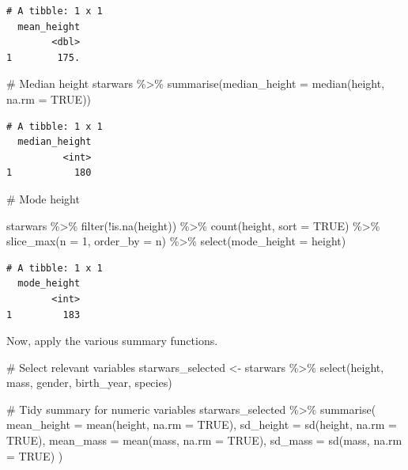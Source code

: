 \documentclass[
  man,
  floatsintext,
  longtable,
  nolmodern,
  notxfonts,
  notimes,
  colorlinks=true,linkcolor=blue,citecolor=blue,urlcolor=blue]{apa7}
\newenvironment{Shaded}{\begin{snugshade}}{\end{snugshade}}
\newcommand{\AttributeTok}[1]{\textcolor[rgb]{0.40,0.45,0.13}{#1}}
\newcommand{\CommentTok}[1]{\textcolor[rgb]{0.37,0.37,0.37}{#1}}
\newcommand{\ConstantTok}[1]{\textcolor[rgb]{0.56,0.35,0.01}{#1}}
\newcommand{\DecValTok}[1]{\textcolor[rgb]{0.68,0.00,0.00}{#1}}
\newcommand{\FunctionTok}[1]{\textcolor[rgb]{0.28,0.35,0.67}{#1}}
\newcommand{\NormalTok}[1]{\textcolor[rgb]{0.00,0.23,0.31}{#1}}
\newcommand{\OtherTok}[1]{\textcolor[rgb]{0.00,0.23,0.31}{#1}}
\newcommand{\SpecialCharTok}[1]{\textcolor[rgb]{0.37,0.37,0.37}{#1}}
\begin{document}
\begin{verbatim}
# A tibble: 1 x 1
  mean_height
        <dbl>
1        175.
\end{verbatim}

\begin{Shaded}
\begin{Highlighting}[]
\CommentTok{\# Median height}
\NormalTok{starwars }\SpecialCharTok{\%\textgreater{}\%} 
  \FunctionTok{summarise}\NormalTok{(}\AttributeTok{median\_height =} \FunctionTok{median}\NormalTok{(height, }\AttributeTok{na.rm =} \ConstantTok{TRUE}\NormalTok{))}
\end{Highlighting}
\end{Shaded}

\begin{verbatim}
# A tibble: 1 x 1
  median_height
          <int>
1           180
\end{verbatim}

\begin{Shaded}
\begin{Highlighting}[]
\CommentTok{\# Mode height}

\NormalTok{starwars }\SpecialCharTok{\%\textgreater{}\%}
  \FunctionTok{filter}\NormalTok{(}\SpecialCharTok{!}\FunctionTok{is.na}\NormalTok{(height)) }\SpecialCharTok{\%\textgreater{}\%}
  \FunctionTok{count}\NormalTok{(height, }\AttributeTok{sort =} \ConstantTok{TRUE}\NormalTok{) }\SpecialCharTok{\%\textgreater{}\%}
  \FunctionTok{slice\_max}\NormalTok{(}\AttributeTok{n =} \DecValTok{1}\NormalTok{, }\AttributeTok{order\_by =}\NormalTok{ n) }\SpecialCharTok{\%\textgreater{}\%}
  \FunctionTok{select}\NormalTok{(}\AttributeTok{mode\_height =}\NormalTok{ height)}
\end{Highlighting}
\end{Shaded}

\begin{verbatim}
# A tibble: 1 x 1
  mode_height
        <int>
1         183
\end{verbatim}

Now, apply the various summary functions.

\begin{Shaded}
\begin{Highlighting}[]
\CommentTok{\# Select relevant variables}
\NormalTok{starwars\_selected }\OtherTok{\textless{}{-}}\NormalTok{ starwars }\SpecialCharTok{\%\textgreater{}\%}
  \FunctionTok{select}\NormalTok{(height, mass, gender, birth\_year, species)}

\CommentTok{\# Tidy summary for numeric variables}
\NormalTok{starwars\_selected }\SpecialCharTok{\%\textgreater{}\%}
  \FunctionTok{summarise}\NormalTok{(}
    \AttributeTok{mean\_height =} \FunctionTok{mean}\NormalTok{(height, }\AttributeTok{na.rm =} \ConstantTok{TRUE}\NormalTok{),}
    \AttributeTok{sd\_height =} \FunctionTok{sd}\NormalTok{(height, }\AttributeTok{na.rm =} \ConstantTok{TRUE}\NormalTok{),}
    \AttributeTok{mean\_mass =} \FunctionTok{mean}\NormalTok{(mass, }\AttributeTok{na.rm =} \ConstantTok{TRUE}\NormalTok{),}
    \AttributeTok{sd\_mass =} \FunctionTok{sd}\NormalTok{(mass, }\AttributeTok{na.rm =} \ConstantTok{TRUE}\NormalTok{)}
\NormalTok{  )}
\end{Highlighting}
\end{Shaded}
\end{document}

